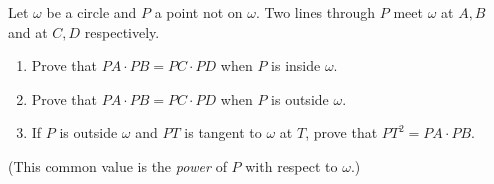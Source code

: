 Let $\omega$ be a circle and $P$ a point not on $\omega$. Two lines through $P$ meet $\omega$ at $A,B$ and at $C,D$ respectively.
\begin{enumerate}
\item[(a)] Prove that $PA\cdot PB=PC\cdot PD$ when $P$ is inside $\omega$.
\item[(b)] Prove that $PA\cdot PB=PC\cdot PD$ when $P$ is outside $\omega$.
\item[(c)] If $P$ is outside $\omega$ and $PT$ is tangent to $\omega$ at $T$, prove that $PT^2=PA\cdot PB$.
\end{enumerate}
(This common value is the \emph{power} of $P$ with respect to $\omega$.)
